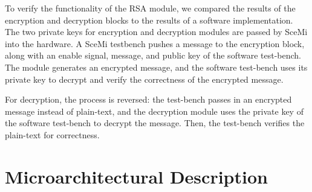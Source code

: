 \documentclass[a4paper,11pt]{report}
\begin{document}
 

To verify the functionality of the RSA module, we compared the results of the encryption and decryption blocks to the results
of a software implementation. The two private keys for encryption and
decryption modules are passed by SceMi into the hardware. A SceMi testbench
pushes a message to the encryption block, along with an enable signal, message,
and public key of the software test-bench. The module generates an encrypted message,
and the software test-bench uses its private key to decrypt and verify the 
correctness of the encrypted message.

For decryption, the process is reversed: the test-bench passes in an 
encrypted message instead of plain-text, and the decryption module uses
the private key of the software test-bench to decrypt the message. Then, the test-bench
verifies the plain-text for correctness.




\chapter*{Microarchitectural Description} 
\end{document}
